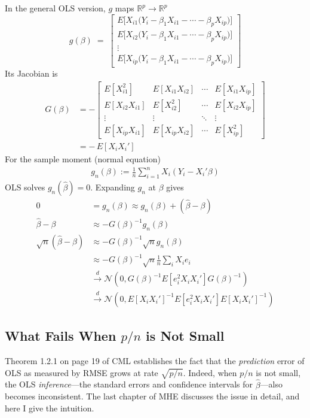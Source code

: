 \documentclass[12pt]{article}
\begin{document}
In the general OLS version, $g$ maps $\mathbb{R}^{p} \rightarrow \mathbb{R}^p$
\[
g(\beta) \;=\;
\begin{bmatrix}
E\big[X_{i1}\big(Y_i - \beta_{1}X_{i1} - \cdots - \beta_{p}X_{ip}\big)\big] \\[6pt]
E\big[X_{i2}\big(Y_i - \beta_{1}X_{i1} - \cdots - \beta_{p}X_{ip}\big)\big] \\[6pt]
\vdots \\[6pt]
E\big[X_{ip}\big(Y_i - \beta_{1}X_{i1} - \cdots - \beta_{p}X_{ip}\big)\big]
\end{bmatrix}
\]
Its Jacobian is 
\begin{align*}
G(\beta) &= 
-\begin{bmatrix}
E[X_{i1}^2] & E[X_{i1}X_{i2}] & \cdots & E[X_{i1}X_{ip}] \\
E[X_{i2}X_{i1}] & E[X_{i2}^2] & \cdots & E[X_{i2}X_{ip}] \\
\vdots & \vdots & \ddots & \vdots \\
E[X_{ip}X_{i1}] & E[X_{ip}X_{i2}] & \cdots & E[X_{ip}^2]
\end{bmatrix} \\
&= -\,E[X_iX_i']
\end{align*}
For the sample moment (normal equation)
\begin{align*}
g_n(\beta) := \frac{1}{n}\sum_{i=1}^{n}X_i(Y_i-X_i'\beta)
\end{align*}
OLS solves $g_n(\hat{\beta})=0$.
Expanding $g_n$ at $\beta$ gives
\begin{align*}
0 &= g_n(\beta) \approx g_n(\beta) + (\hat{\beta} - \beta) \\
\hat{\beta} - \beta &\approx -G(\beta)^{-1}  g_n(\beta) \\
\sqrt{n} (\hat{\beta} - \beta) &\approx -G(\beta)^{-1}  \sqrt{n} g_n(\beta) \\
&\approx -G(\beta)^{-1}  \sqrt{n} \frac{1}{n} \sum_i X_ie_i \\
&\xrightarrow{d} \mathcal{N}(0, G(\beta)^{-1} E[e_i^2X_iX_i'] G(\beta)^{-1}) \\
&\xrightarrow{d} \mathcal{N}\left( 0, E[X_iX_i']^{-1}E[e_i^2 X_i X_i'] E[X_iX_i']^{-1} \right)
\end{align*}

\subsection{What Fails When $p/n$ is Not Small}

Theorem 1.2.1 on page 19 of \textcolor{titlecolor}{CML} establishes the fact that the \textit{prediction} error of OLS as measured by RMSE grows at rate $\sqrt{p/n}$. Indeed, when $p/n$ is not small, the OLS \textit{inference}—the standard errors and confidence intervals for $\hat{\beta}$—also becomes inconsistent. The last chapter of \textcolor{titlecolor}{MHE} discusses the issue in detail, and here I give the intuition.
\end{document}
